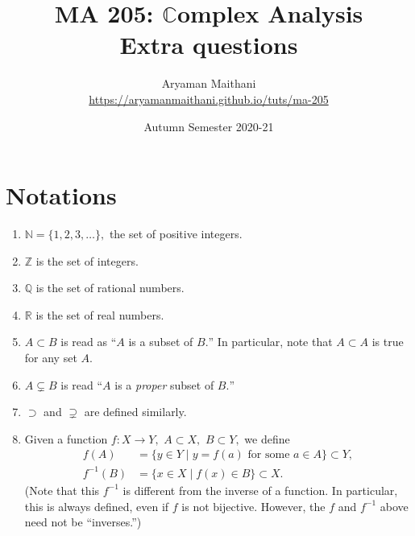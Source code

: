 \documentclass[12pt]{article}
\title{MA 205: $\mathbb{C}$omplex Analysis\\\large{Extra questions}}
\author{Aryaman Maithani\\\url{https://aryamanmaithani.github.io/tuts/ma-205}}
\date{Autumn Semester 2020-21}
\theoremstyle{definition}
\numberwithin{thm}{section}
\begin{document}
\maketitle
\setcounter{section}{-1}
\tableofcontents
\newpage\section{Notations} \label{sec:notations}
\begin{enumerate}
	\item $\mathbb{N} = \{1, 2, 3, \ldots\},$ the set of positive integers.
	\item $\mathbb{Z}$ is the set of integers.
	\item $\mathbb{Q}$ is the set of rational numbers.
	\item $\mathbb{R}$ is the set of real numbers.
	\item $A \subset B$ is read as ``$A$ is a subset of $B.$'' In particular, note that $A \subset A$ is true for any set $A.$
	\item $A \subsetneq B$ is read ``$A$ is a \emph{proper} subset of $B.$''
	\item $\supset$ and $\supsetneq$ are defined similarly.
	\item Given a function $f:X \to Y,$ $A \subset X,$ $B \subset Y,$ we define
	\begin{align*} 
		f(A) &= \{y \in Y \mid y = f(a) \text{ for some } a \in A\} \subset Y,\\
		f^{-1}(B) &= \{x \in X \mid f(x) \in B\} \subset X.
	\end{align*}
	(Note that this $f^{-1}$ is different from the inverse of a function. In particular, this is always defined, even if $f$ is not bijective. However, the $f$ and $f^{-1}$ above need not be ``inverses.'')

\end{enumerate}
\end{document}
